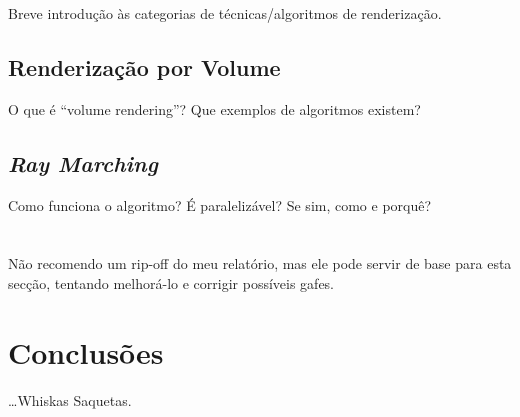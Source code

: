 Breve introdução às categorias de técnicas/algoritmos de renderização.

\subsection{Renderização por Volume}
\label{ssec::arte:render:volume}

O que é ``volume rendering''? Que exemplos de algoritmos existem?

\subsection{\emph{Ray Marching}}
\label{ssec::arte:render:raymarch}

Como funciona o algoritmo? É paralelizável? Se sim, como e porquê?


\section{\opengl}
\label{sec::arte:opengl}

Não recomendo um rip-off do meu relatório, mas ele pode servir de base para esta secção, tentando melhorá-lo e corrigir possíveis gafes.


\section{Conclusões}
\label{sec::arte:conc}

\ldots Whiskas Saquetas.
